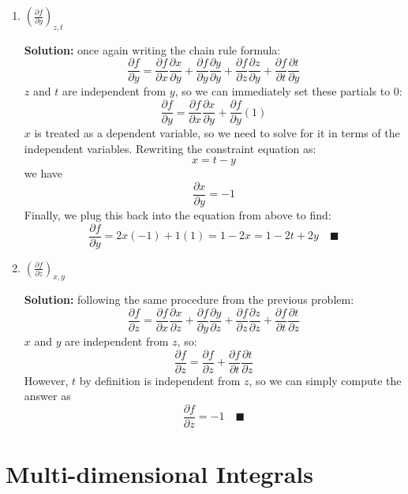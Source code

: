 \documentclass[letterpaper, 11pt]{article}
\begin{document}
\begin{enumerate}[label=(\alph*)]
\item $\left( \frac{\partial f}{\partial y}\right)_{z,t}$
\par \textbf{Solution:} once again writing the chain rule formula:
\[ \frac{\partial f}{\partial y} = \frac{ \partial f}{\partial x}\frac{\partial x}{\partial y} + \frac{ \partial f}{\partial y}\frac{\partial y}{\partial y} +  \frac{ \partial f}{\partial z}\frac{\partial z}{\partial y}  + \frac{ \partial f}{\partial t}\frac{\partial t}{\partial y}  \]
$z$ and $t$ are independent from $y$, so we can immediately set these partials to 0:
\[ \frac{\partial f}{\partial y} = \frac{ \partial f}{\partial x}\frac{\partial x}{\partial y} + \frac{ \partial f}{\partial y}(1)  \]
$x$ is treated as a dependent variable, so we need to solve for it in terms of the independent variables. Rewriting the constraint equation as:
\[ x = t - y\]
we have
\[ \frac{ \partial x}{\partial y } = -1 \]
Finally, we plug this back into the equation from above to find:
\[ \frac{\partial f}{\partial y} = 2x(-1) + 1(1) = 1 - 2x =1 - 2t + 2y \quad\blacksquare  \]

\item $\left( \frac{\partial f}{\partial z}\right)_{x,y}$
\par \textbf{Solution:} following the same procedure from the previous problem:
\[ \frac{\partial f}{\partial z} = \frac{ \partial f}{\partial x}\frac{\partial x}{\partial z} + \frac{ \partial f}{\partial y}\frac{\partial y}{\partial z} +  \frac{ \partial f}{\partial z}\frac{\partial z}{\partial z}  + \frac{ \partial f}{\partial t}\frac{\partial t}{\partial z}  \]
$x$ and $y$ are independent from $z$, so:
\[ \frac{\partial f}{\partial z} =  \frac{ \partial f}{\partial z}  + \frac{ \partial f}{\partial t}\frac{\partial t}{\partial z}  \]
However, $t$ by definition is independent from $z$, so we can simply compute the answer as 
\[ \frac{ \partial f }{\partial z} = -1 \quad\blacksquare \]
\end{enumerate}

\section{Multi-dimensional Integrals}
\end{document}
